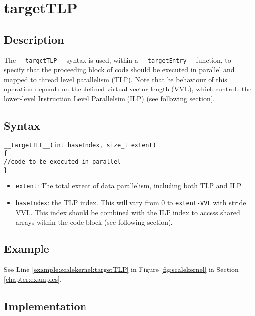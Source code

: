 


\newpage
\section{targetTLP}

\subsection{Description}

The \verb+__targetTLP__+ syntax is used, within a \verb+__targetEntry__+
function, to specify that the proceeding block of code should be
executed in parallel and mapped to thread level parallelism
(TLP). Note that he behaviour of this operation depends on the defined
virtual vector length (VVL), which controls the lower-level
Instruction Level Parallelsim (ILP) (see following section).

\subsection{Syntax}
\begin{verbatim}
__targetTLP__(int baseIndex, size_t extent) 
{
//code to be executed in parallel
}
\end{verbatim}

\begin{itemize}
\item \verb+extent+: The total extent of data parallelism, including
  both TLP and ILP
\item \verb+baseIndex+: the TLP index. This will vary from 0 to \verb+extent-VVL+ with stride VVL. This index should be combined with the ILP index to access shared arrays within the code block (see following section).

\end{itemize}


\subsection{Example}
See Line \ref{example:scalekernel:targetTLP} in Figure \ref{fig:scalekernel} in Section \ref{chapter:examples}.

\subsection{Implementation}
